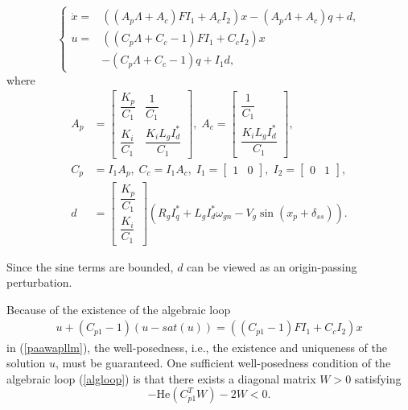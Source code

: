 \documentclass[10pt,final,journal,twoside]{IEEEtran}
\begin{document}
\begin{equation}\label{paawapllm}
\left\{\begin{aligned}
    \dot{x}=&\left(\left(A_p\Lambda+A_c\right)FI_1+A_cI_2\right)x-\left(A_p\Lambda+A_c\right)q+d,\\
    u=&\left(\left(C_p\Lambda+C_c-1\right)FI_1+C_cI_2\right)x\\
    &-\left(C_p\Lambda+C_c-1\right)q+I_1d,
\end{aligned}\right.
\end{equation}
where
\begin{align*}A_p&=\begin{bmatrix}
    \dfrac{K_p}{C_1}&\dfrac{1}{C_1}\\\dfrac{K_i}{C_1}&\dfrac{K_iL_gI_d^*}{C_1}
\end{bmatrix},\;A_c=\begin{bmatrix}
    \dfrac{1}{C_1}\\\dfrac{K_iL_gI_d^*}{C_1}
\end{bmatrix},\\
C_p&=I_1A_p,\;C_c=I_1A_c,\;I_1=\begin{bmatrix}
    1&0
\end{bmatrix},\;I_2=\begin{bmatrix}
    0&1
\end{bmatrix},\\
d&=\begin{bmatrix}
    \dfrac{K_p}{C_1}\\
    \dfrac{K_i}{C_1}
\end{bmatrix}\left(R_gI_q^*+L_gI_d^*\omega_{gn}-V_g\sin\left(x_p+\delta_{ss}\right)\right).\end{align*}

Since the sine terms are bounded, $d$ can be viewed as an origin-passing perturbation.

Because of the existence of the algebraic loop
\begin{multline}\label{algloop}
u+\left(C_{p1}-1\right)\left(u-sat(u)\right)=\left(\left(C_{p1}-1\right)FI_1+C_cI_2\right)x
\end{multline}
in (\ref{paawapllm}), the well-posedness, i.e., the existence and uniqueness of the solution $u$, must be guaranteed. One sufficient well-posedness condition of the algebraic
loop (\ref{algloop}) is that there exists a diagonal matrix $W>0$ satisfying
\begin{equation}\label{wpcond}
    -\textrm{He}\left(C_{p1}^TW\right)-2W<0.
\end{equation}\par
\end{document}
